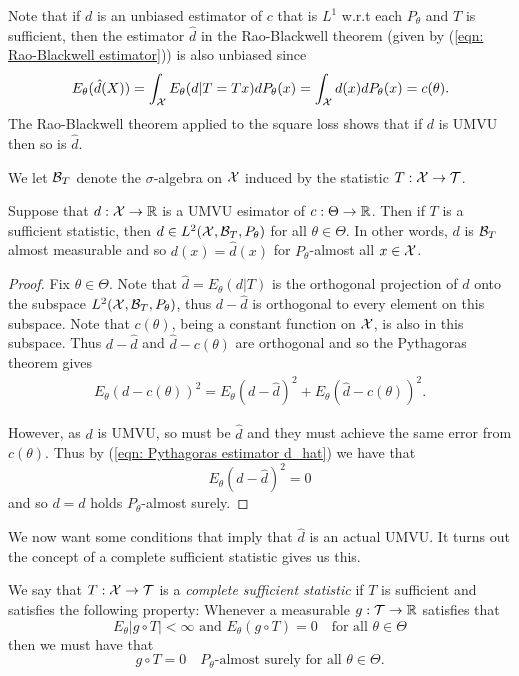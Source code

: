 \documentclass[twoside, a4paper, 10pt]{amsart}
\begin{document}
Note that if $d$ is an unbiased estimator of $c$ that is $L^1$ w.r.t each $P_{\theta}$ and $T$ is sufficient, then the estimator $\hat{d}$ in the Rao-Blackwell theorem (given by (\ref{eqn: Rao-Blackwell estimator})) is also unbiased since $$E_{\theta}(\hat{d}(X)) =  \int_{\mathcal{X}} E_{\theta}(d|T=Tx) dP_{\theta}(x) = \int_{\mathcal{X}} d(x) dP_{\theta}(x) = c(\theta).$$ 
The Rao-Blackwell theorem applied to the square loss shows that if $d$ is UMVU then so is $\hat{d}$.

We let $\mathcal{B}_T$ denote the $\sigma$-algebra on $\mathcal{X}$ induced by the statistic $T:\mathcal{X} \to \mathcal{T}$.
\begin{prop} \label{prop: UMVU is T mes} Suppose that $d:\mathcal{X} \to \mathbb{R}$ is a UMVU esimator of $c:\Theta \to \mathbb{R}$. Then if $T$ is a sufficient statistic, then $d \in L^2(\mathcal{X}, \mathcal{B}_T, P_{\theta})$ for all $\theta \in \Theta$. In other words, $d$ is $\mathcal{B}_T$ almost measurable and so $d(x) = \hat{d}(x)$ for $P_{\theta}$-almost all $x \in \mathcal{X}$. \end{prop}

\begin{proof} Fix $\theta \in \Theta$. Note that $\hat{d} = E_{\theta}(d|T)$ is the orthogonal projection of $d$ onto the subspace $L^2(\mathcal{X}, \mathcal{B}_T, P_{\theta})$, thus $d - \hat{d}$ is orthogonal to every element on this subspace. Note that $c(\theta)$, being a constant function on $\mathcal{X}$, is also in this subspace. Thus $d - \hat{d}$ and $\hat{d} - c(\theta)$ are orthogonal and so the Pythagoras theorem gives 
\begin{align}\label{eqn: Pythagoras estimator d_hat} E_{\theta}(d - c(\theta))^2 = E_{\theta}(d - \hat{d})^2 + E_{\theta}(\hat{d} - c(\theta))^2  . \end{align}

However, as $d$ is UMVU, so must be $\hat{d}$ and they must achieve the same error from $c(\theta)$. Thus by (\ref{eqn: Pythagoras estimator d_hat}) we have that $$E_{\theta}(d - \hat{d})^2 = 0$$ and so $d = \hat{d}$ holds $P_{\theta}$-almost surely. \end{proof}

We now want some conditions that imply that $\hat{d}$ is an actual UMVU. It turns out the concept of a complete sufficient statistic gives us this.

\begin{mydef} We say that $T:\mathcal{X} \to \mathcal{T}$ is a \textit{complete sufficient statistic} if $T$ is sufficient and satisfies the following property:  Whenever a measurable $g:\mathcal{T} \to \mathbb{R}$ satisfies that $$E_{\theta}|g \circ T| < \infty \text{ and } E_{\theta}(g \circ T) = 0 \quad\text{for all } \theta \in \Theta$$ then we must have that $$g \circ T = 0 \quad\text{$P_{\theta}$-almost surely for  all } \theta \in \Theta.$$

\end{mydef}
\end{document}
